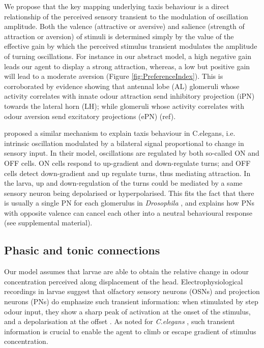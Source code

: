 \documentclass[11pt,a4paper]{article}
\newcommand{\Dros }{\emph{Drosophila }}
\newcommand{\todoAW}[1]{\todo[author=AW,color=green, size=\tiny,inline]{#1}}
\begin{document}
We propose that the key mapping underlying taxis behaviour is a direct relationship of the perceived sensory transient to the modulation of oscillation amplitude.
Both the valence (attractive or aversive) and salience (strength of attraction or aversion) of stimuli is determined simply by the value of the effective gain by which the perceived stimulus transient modulates the amplitude of turning oscillations. For instance in our abstract model, a high negative gain leads our agent to display a strong attraction, whereas, a low but positive gain will lead to a moderate aversion (Figure \ref{fig:PreferenceIndex}). This is corroborated by evidence showing that antennal lobe (AL) glomeruli whose activity correlates with innate odour attraction send inhibitory projection (iPN) towards the lateral horn (LH); while glomeruli whose activity correlates with odour aversion send excitatory projections (ePN) (ref). 

 \cite{izquierdo2010evolution} proposed a similar mechanism to explain taxis behaviour in C.elegans, i.e. intrinsic oscillation modulated by a bilateral signal proportional to change in sensory input. In their model, oscillations are regulated by both so-called ON and OFF cells. ON cells respond to up-gradient and down-regulate turns; and OFF cells detect down-gradient and up regulate turns, thus mediating attraction. In the larva, up and down-regulation of the turns could be mediated by a same sensory neuron being depolarised or hyperpolarised. This fits the fact that there is usually a single PN for each glomerulus in \Dros \citep{ramaekers2005glomerular} %
 , and explains how PNs with opposite valence can cancel each other into a neutral behavioural response (see supplemental material). 
  
\subsection{Phasic and tonic connections}
Our model assumes that larvae are able to obtain the relative change in odour concentration perceived along displacement of the head.  Electrophysiological recordings in larvae suggest that olfactory sensory neurons (OSNs) \citep{nagel2011biophysical,schulze2015dynamical} and projection neurons (PNs) do emphasize such transient information: when stimulated by step odour input, they show a sharp peak of activation at the onset of the stimulus, and a depolarisation at the offset \cite{schulze2015dynamical}. As noted for {\it C.elegans} \citep{lockery2011computational}, such transient information is crucial to enable the agent to climb or escape gradient of stimulus concentration. 
\end{document}
